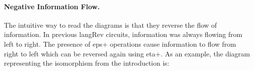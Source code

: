\documentclass[preprint]{sigplanconf}
\begin{document}
\paragraph*{Negative Information Flow.} 
The intuitive way to read the diagrams is that they reverse the flow of
information. In previous {{langRev}} circuits, information was always flowing
from left to right. The presence of {{eps+}} operations cause information to
flow from right to left which can be reversed again using {{eta+}}.  As an
example, the diagram representing the isomorphism from the introduction is:
\begin{center}
\end{center}
\end{document}
